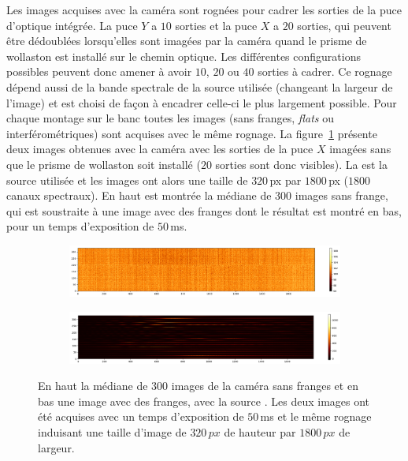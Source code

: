 
Les images acquises avec la caméra sont rognées pour cadrer les sorties de la puce d'optique intégrée. La puce $Y$ a $10$ sorties et la puce $X$ a $20$ sorties, qui peuvent être dédoublées lorsqu'elles sont imagées par la caméra quand le prisme de wollaston est installé sur le chemin optique. Les différentes configurations possibles peuvent donc amener à avoir $10$, $20$ ou $40$ sorties à cadrer. Ce rognage dépend aussi de la bande spectrale de la source utilisée (changeant la largeur de l'image) et est choisi de façon à encadrer celle-ci le plus largement possible. Pour chaque montage sur le banc toutes les images (sans franges, \textit{flats} ou interférométriques) sont acquises avec le même rognage. La figure~\ref{fig:FringeCrop} présente deux images obtenues avec la caméra avec les sorties de la puce $X$ imagées sans que le prisme de wollaston soit installé ($20$ sorties sont donc visibles). La \sk est la source utilisée et les images ont alors une taille de $320 \,$px par $1800 \,$px ($1800$ canaux spectraux). En haut est montrée la médiane de $300$ images sans frange, qui est soustraite à une image avec des franges dont le résultat est montré en bas, pour un temps d'exposition de $50 \,$ms.

\begin{figure}[ht!]
    \centering
    \begin{subfigure}{0.9\textwidth}
        \includegraphics[width=\textwidth]{Figure_Chap3/20220614_P2VM_Dark1_50ms_median300.png}
    \end{subfigure}
    \begin{subfigure}{0.9\textwidth}
        \includegraphics[width=\textwidth]{Figure_Chap3/20220614_P2VM_FullOn_001_50ms_Im0_SubDark.png}
    \end{subfigure}
    \caption[Image interférométrique obtenues sur FIRSTv2.]{En haut la médiane de $300$ images de la caméra sans franges et en bas une image avec des franges, avec la source \sk. Les deux images ont été acquises avec un temps d'exposition de $50 \,$ms et le même rognage induisant une taille d'image de $320 \, px$ de hauteur par $1800 \, px$ de largeur.}
    \label{fig:FringeCrop}
\end{figure}

